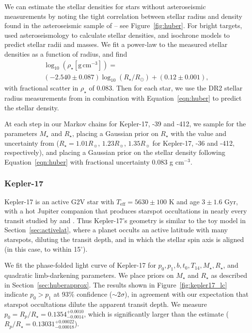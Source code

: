 We can estimate the stellar densities for stars without asteroseismic measurements by noting the tight correlation between stellar radius and density found in the asteroseismic sample of \citet{Huber2013} -- see Figure~\ref{fig:huber}. For bright \kepler targets, \citet{Huber2013} used asteroseismology to calculate stellar densities, and isochrone models to predict stellar radii and masses. We fit a power-law to the measured stellar densities as a function of radius, and find 
\begin{equation}
\begin{split}
\log_{10} \left(\rho_\star [\mathrm{g \, cm}^{-3}] \right) = \\ \left( -2.540 \pm 0.087 \right) \log_{10}  \left( R_\star/R_\odot \right) + \left( 0.12 \pm 0.001 \right), \label{eqn:huber}
\end{split}
\end{equation}
with fractional scatter in $\rho_\star$ of 0.083. Then for each star, we use the \gaia DR2 \citep{Gaia2018} stellar radius measurements from \citet{Berger2018} in combination with Equation~\ref{eqn:huber} to predict the stellar density. 

At each step in our Markov chains for Kepler-17, -39 and -412, we sample for the parameters $M_\star$ and $R_\star$, placing a Gaussian prior on $R_\star$ with the value and uncertainty from \gaia \citep{Berger2018} ($R_\star = 1.01R_\sun$, $1.23 R_\sun$, $1.35 R_\sun$ for Kepler-17, -36 and -412, respectively), and placing a Gaussian prior on the stellar density following Equation~\ref{eqn:huber} with fractional uncertainty 0.083 g cm$^{-3}$. 

\subsubsection{Kepler-17} \label{sec:k17}

Kepler-17 is an active G2V star with $T_\mathrm{eff} = 5630 \pm 100$ K and age $3 \pm 1.6$ Gyr, with a hot Jupiter companion that produces starspot occultations in nearly every transit studied by \citet{Desert2011} and \citet{Davenport2015thesis}. Thus Kepler-17's geometry is similar to the toy model in Section~\ref{sec:activelat}, where a planet occults an active latitude with many starspots, diluting the transit depth, and in which the stellar spin
axis is aligned (in this case, to within 15$^\circ$).

We fit the phase-folded \kepler light curve of Kepler-17 for $p_0, p_1, b, t_0, T_{14}, M_\star, R_\star$, and quadratic limb-darkening parameters. We place priors on $M_\star$ and $R_\star$ as described in Section~\ref{sec:huberapprox}. The results shown in Figure~\ref{fig:kepler17_lc} indicate $p_0 > p_1$ at 93\% confidence ($\sim 2 \sigma$), in agreement with our expectation that starspot occultations dilute the apparent transit depth. We measure $p_0 = R_p/R_\star = 0.1354_{-0.0014}^{+0.0010}$, which is significantly larger than the \citet{Desert2011} estimate ($R_p/R_\star = 0.13031^{+0.00022}_{-0.00018}$).

